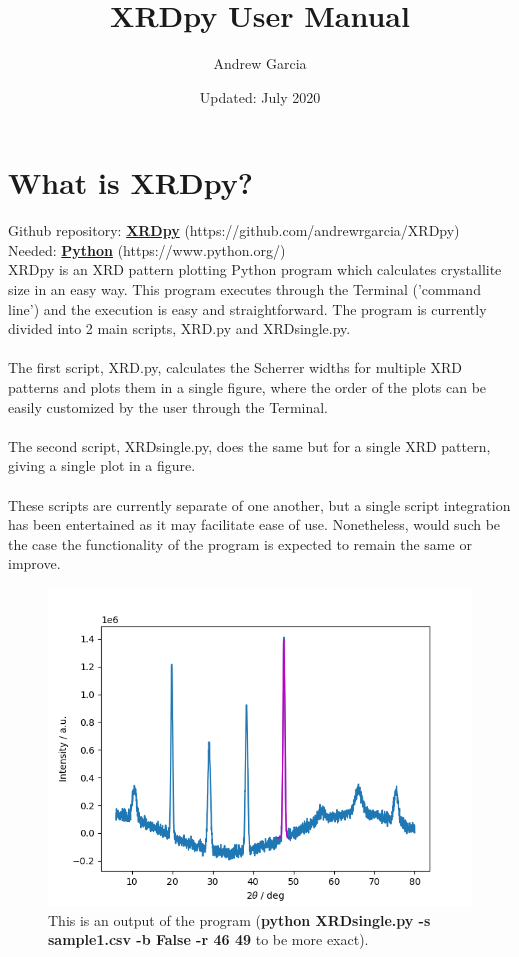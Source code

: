 \documentclass{article}
\title{XRDpy User Manual}
\author{Andrew Garcia}
\date{Updated: July 2020}
\begin{document}
  
\maketitle


\tableofcontents

\pagebreak

\section{What is XRDpy?}

Github repository: \textcolor{blue(ncs)}{\textbf{\href{https://github.com/andrewrgarcia/XRDpy}{XRDpy}}} \hfill (https://github.com/andrewrgarcia/XRDpy)\\
Needed: \textcolor{blue(ncs)}{\textbf{\href{https://www.python.org/}{Python}}} \hfill (https://www.python.org/)\\
XRDpy is an XRD pattern plotting Python program which calculates crystallite size in an easy way. This program executes through the Terminal ('command line') and the execution is easy and straightforward. The program is currently divided into 2 main scripts, XRD.py and XRDsingle.py. \\\\
The first script, XRD.py, calculates the Scherrer widths for multiple XRD patterns and plots them in a single figure, where the order of the plots can be easily customized by the user through the Terminal. \\\\
The second script, XRDsingle.py, does the same but for a single XRD pattern, giving a single plot in a figure.\\\\
These scripts are currently separate of one another, but a single script integration has been entertained as it may facilitate ease of use. Nonetheless, would such be the case the functionality of the program is expected to remain the same or improve. 

\begin{figure}[htbp]
\centerline{\includegraphics[scale=0.8]{intro.png}}
\caption{This is an output of the program (\textbf{python XRDsingle.py -s sample1.csv -b False -r 46 49} to be more exact).}
\label{fig}
\end{figure}
\end{document}
